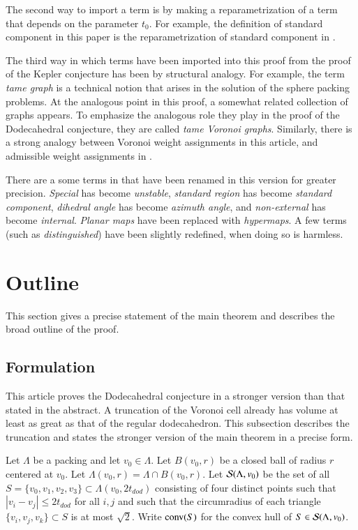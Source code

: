 \documentclass{article} %
\begin{document}
The second way to import a term is by making a reparametrization of a
term that depends on the parameter $t_0$. For example, the definition
of standard component in this paper is the reparametrization of
standard component in \cite{Hales:2006:DCG}.

The third way in which terms have been imported into this proof from
the proof of the Kepler conjecture has been by structural analogy. For
example, the term {\it tame graph} is a technical notion that arises
in the solution of the sphere packing problems. At the analogous point
in this proof, a somewhat related collection of graphs appears. 
To emphasize the analogous role they play in the proof
of the Dodecahedral conjecture, they are called {\it tame Voronoi
graphs}. Similarly, there is a strong analogy between Voronoi weight
assignments in this article, and admissible weight assignments in
\cite{Hales:2006:DCG}. %

There are a some terms in that have been renamed in this version for
greater precision. {\it Special} has become {\it unstable}, {\it
standard region} has become {\it standard component}, {\it dihedral
angle} has become {\it azimuth angle}, and {\it non-external} has
become {\it internal}. {\it Planar maps} have been replaced with {\it
hypermaps}. A few terms (such as {\it distinguished}) have been
slightly redefined, when doing so is harmless.

\section{Outline}

This section gives a precise statement of the main theorem
and describes the broad outline of the proof.

\subsection{Formulation}
\label{sec:form}

This article proves the Dodecahedral conjecture in a stronger
version than that stated in the abstract. A truncation of the Voronoi
cell already has volume at least as great as that of the regular
dodecahedron. This subsection describes the truncation and states the
stronger version of the main theorem in a precise form.

Let $\Lambda$ be a packing and let $v_0\in\Lambda$. Let $B(v_0,r)$ be
a closed ball of radius $r$ centered at $v_0$. Let $\Lambda(v_0,r) =
\Lambda\cap B(v_0,r)$. Let ${\mathcal S}(\Lambda,v_0)$ be the set of all
$S=\{v_0,v_1,v_2,v_3\}\subset\Lambda(v_0,2t_{dod})$ consisting of four
distinct points such that $|v_i-v_j|\le 2t_{dod}$ for all $i,j$ and
such that the circumradius of each triangle $\{v_i,v_j,v_k\}\subset S$
is at most $\sqrt2$. Write ${\operatorname{conv}}(S)$ for the convex hull of
$S\in{\mathcal S}(\Lambda,v_0)$.
\end{document}
